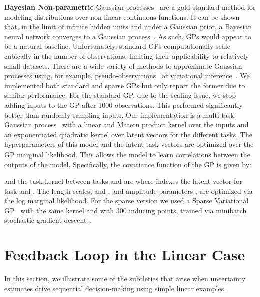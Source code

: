 \documentclass{article} \usepackage{iclr2018_conference,times}
\begin{document}
\textbf{Bayesian Non-parametric} Gaussian processes~\citep{Rasmussen2005} are a gold-standard method for modeling distributions over non-linear continuous functions.  It can be shown that, in the limit of infinite hidden units and under a Gaussian prior, a Bayesian neural network converges to a Gaussian process~\citep{Neal1994}.  As such, GPs would appear to be a natural baseline.  Unfortunately, standard GPs computationally scale cubically in the number of observations, limiting their applicability to relatively small datasets.  There are a wide variety of methods to approximate Gaussian processes using, for example, pseudo-observations~\citep{snelson-ghahramani2006} or variational inference~\citep{titsias2009}.  We implemented both standard and sparse GPs but only report the former due to similar performance.  For the standard GP, due to the scaling issue, we stop adding inputs to the GP after 1000 observations.  This performed significantly better than randomly sampling inputs.  Our implementation is a multi-task Gaussian process~\citep{Bonilla2008} with a linear and Matern  product kernel over the inputs and an exponentiated quadratic kernel over latent vectors for the different tasks.  The hyperparameters of this model and the latent task vectors are optimized over the GP marginal likelihood. This allows the model to learn correlations between the outputs of the model.
Specifically, the covariance function  of the GP is given by:
\newcommand{\brmx}{\mathrm{\mathbf{x}}}
\newcommand{\blambda}{\mathbf{\lambda}}
\newcommand{\brmxhat}{\mathrm{\mathbf{\hat{x}}}}
\newcommand{\brmv}{\mathrm{\mathbf{v}}}
\newcommand{\brmvhat}{\mathrm{\mathbf{\hat{v}}}}

and the task kernel between tasks  and  are  where  indexes the latent vector for task  and . The length-scales,  and , and amplitude parameters ,  are optimized via the log marginal likelihood. For the sparse version we used a Sparse Variational GP~\citep{hensman2014} with the same kernel and with 300 inducing points, trained via minibatch stochastic gradient descent~\citep{GPflow2017}.



 \section{Feedback Loop in the Linear Case}\label{s:linear}
In this section, we illustrate some of the subtleties that arise when uncertainty estimates drive sequential decision-making using simple linear examples.
\end{document}
